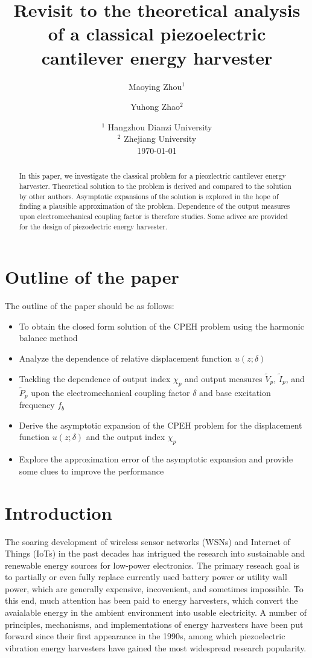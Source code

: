 \documentclass{article}
\title{Revisit to the theoretical analysis of a classical piezoelectric cantilever energy harvester}
\author{Maoying Zhou$^1$ \and Yuhong Zhao$^2$}
\date{%
    $^1$ Hangzhou Dianzi University\\%
    $^2$ Zhejiang University\\[2ex]%
    \today
}
\begin{document}
\maketitle


\begin{abstract}
 In this paper, we investigate the classical problem for a pieozlectric cantilever energy harvester. Theoretical solution to the problem is derived and compared to the solution by other authors. Asymptotic expansions of the solution is explored in the hope of finding a plausible approximation of the problem. Dependence of the output measures upon electromechanical coupling factor is therefore studies. Some adivce are provided for the design of piezoelectric energy harvester.
\end{abstract}

\section{Outline of the paper}
The outline of the paper should be as follows:
\begin{itemize}
    \item To obtain the closed form solution of the CPEH problem using the harmonic balance method
    \item Analyze the dependence of relative displacement function $u(z;\delta)$
    \item Tackling the dependence of output index $\chi_p$ and output measures $\tilde{V}_p$, $\tilde{I}_p$, and $\tilde{P}_p$ upon the electromechanical coupling factor $\delta$ and base excitation frequency $f_b$
    \item Derive the asymptotic expansion of the CPEH problem for the displacement function $u(z;\delta)$ and the output index $\chi_p$
    \item Explore the approximation error of the asymptotic expansion and provide some clues to improve the performance
\end{itemize}

\section{Introduction}
 
The soaring development of wireless sensor networks (WSNs) and Internet of Things (IoTs) in the past decades has intrigued the research into sustainable and renewable energy sources for low-power electronics. The primary reseach goal is to partially or even fully replace currently used battery power or utility wall power, which are generally expensive, incovenient, and sometimes impossible. To this end, much attention has been paid to energy harvesters, which convert the avaialable energy in the ambient environment into usable electricity. A number of principles, mechanisms, and implementations of energy harvesters have been put forward since their first appearance in the 1990s, \cite{beeby2006energy,anton2007review,zhou2018review,safaei2019review} among which piezoelectric vibration energy harvesters have gained the most widespread research popularity. 
\end{document}
